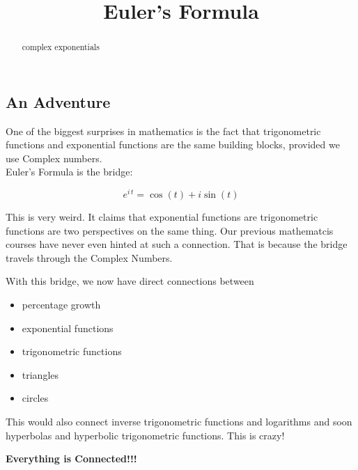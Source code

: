 \documentclass{ximera}
\title{Euler's Formula}
\begin{document}
\begin{abstract}
complex exponentials
\end{abstract}
\maketitle






\subsection{An Adventure}




One of the biggest surprises in mathematics is the fact that trigonometric functions and exponential functions are the same building blocks, provided we use Complex numbers. \\


Euler's Formula is the bridge:



\[    e^{i \, t} = \cos(t) + i \sin(t)    \]



This is very weird.  It claims that exponential functions are trigonometric functions are two perspectives on the same thing.  Our previous mathematcis courses have never even hinted at such a connection.  That is because the bridge  travels through the Complex Numbers.



With this bridge, we now have direct connections between


\begin{itemize}
\item percentage growth
\item exponential functions
\item trigonometric functions
\item triangles
\item circles
\end{itemize}

This would also connect inverse trigonometric functions and logarithms and soon hyperbolas and hyperbolic trigonometric functions.  This is crazy!


\begin{center}
\textbf{\textcolor{red!80!black}{Everything is Connected!!!}}
\end{center}
\end{document}
